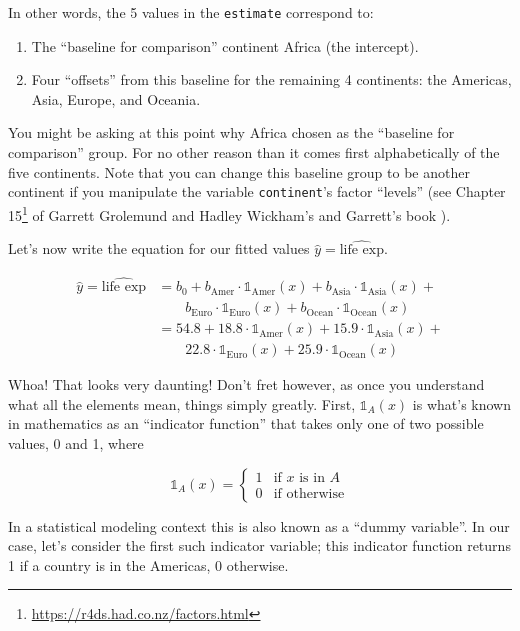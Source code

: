\documentclass[12pt, krantz2,]{krantz}
\providecommand{\tightlist}{%
  \setlength{\itemsep}{0pt}\setlength{\parskip}{0pt}}
\renewcommand{\href}[2]{#2\footnote{\url{#1}}}
\begin{document}
In other words, the 5 values in the \texttt{estimate} correspond to:

\begin{enumerate}
\def\labelenumi{\arabic{enumi}.}
\tightlist
\item
  The ``baseline for comparison'' continent Africa (the intercept).
\item
  Four ``offsets'' from this baseline for the remaining 4 continents: the Americas, Asia, Europe, and Oceania.
\end{enumerate}

You might be asking at this point why Africa chosen as the ``baseline for comparison'' group. For no other reason than it comes first alphabetically of the five continents. Note that you can change this baseline group to be another continent if you manipulate the variable \texttt{continent}'s factor ``levels'' (see \href{https://r4ds.had.co.nz/factors.html}{Chapter 15} of Garrett Grolemund and Hadley Wickham's and Garrett's book \citep{rds2016}).

Let's now write the equation for our fitted values \(\widehat{y} = \widehat{\text{life exp}}\).

\[
\begin{aligned}
\widehat{y} = \widehat{\text{life exp}} &= b_0 + b_{\text{Amer}}\cdot\mathbb{1}_{\mbox{Amer}}(x) + b_{\text{Asia}}\cdot\mathbb{1}_{\mbox{Asia}}(x) + \\
& \qquad b_{\text{Euro}}\cdot\mathbb{1}_{\mbox{Euro}}(x) + b_{\text{Ocean}}\cdot\mathbb{1}_{\mbox{Ocean}}(x)\\
&= 54.8 + 18.8\cdot\mathbb{1}_{\mbox{Amer}}(x) + 15.9\cdot\mathbb{1}_{\mbox{Asia}}(x) + \\
& \qquad 22.8\cdot\mathbb{1}_{\mbox{Euro}}(x) + 25.9\cdot\mathbb{1}_{\mbox{Ocean}}(x)
\end{aligned}
\]

Whoa! That looks very daunting! Don't fret however, as once you understand what all the elements mean, things simply greatly. First, \(\mathbb{1}_{A}(x)\) is what's known in mathematics as an ``indicator function'' that takes only one of two possible values, 0 and 1, where

\[
\mathbb{1}_{A}(x) = \left\{
\begin{array}{ll}
1 & \text{if } x \text{ is in } A \\
0 & \text{if } \text{otherwise} \end{array}
\right.
\]

In a statistical modeling context this is also known as a ``dummy variable''. In our case, let's consider the first such indicator variable; this indicator function returns 1 if a country is in the Americas, 0 otherwise.
\end{document}
